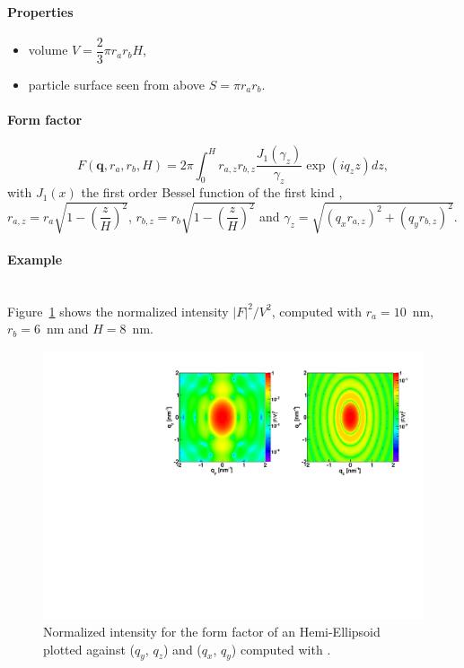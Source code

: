 \paragraph{Properties}
\begin{itemize}
\item volume $V = \dfrac{2}{3}\pi r_a r_bH$,
\item particle surface seen from above $S =\pi r_a r_b$.
\end{itemize}

\paragraph{Form factor}
\begin{equation*}
F(\mathbf{q},r_a,r_b,H) = 2\pi \int_0 ^{H} r_{a,z} r_{b,z}
\frac{J_1(\gamma_z)}{\gamma_z}\exp(iq_z z)dz,
\end{equation*}
with $J_1(x)$ the first order
Bessel function of the first kind \cite{AbSt64}, $r_{a,z} = r_a \sqrt{1-\left(\dfrac{z}{H} \right)^2}$, ${r_{b,z} = r_b
\sqrt{1-\left(\dfrac{z}{H} \right)^2}}$ and $\gamma_z =\sqrt{(q_x r_{a,z})^2+(q_y r_{b,z})^2}$.


\paragraph{Example}\strut\\
Figure~\ref{fig:FFhemiellipsEx} shows the normalized intensity
$|F|^2/V^2$, computed with $r_a=10$~nm, $r_b=6$~nm and $H=8$~nm.

\begin{figure}[h]
\begin{center}
\includegraphics[angle=-90,width=\textwidth]{fig/ff/figffhemiellips.pdf}
\end{center}
\caption{Normalized intensity for the form factor of an Hemi-Ellipsoid plotted against ($q_y$, $q_z$) and  ($q_x$, $q_y$)
  computed with .}
\label{fig:FFhemiellipsEx}
\end{figure}

